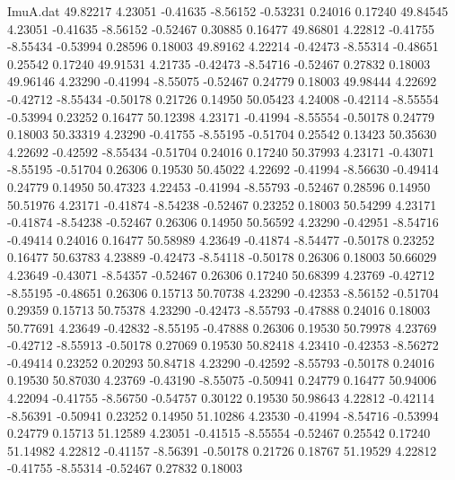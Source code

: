 \begin{filecontents}{ImuA.dat}
  49.82217    4.23051   -0.41635   -8.56152   -0.53231    0.24016    0.17240
  49.84545    4.23051   -0.41635   -8.56152   -0.52467    0.30885    0.16477
  49.86801    4.22812   -0.41755   -8.55434   -0.53994    0.28596    0.18003
  49.89162    4.22214   -0.42473   -8.55314   -0.48651    0.25542    0.17240
  49.91531    4.21735   -0.42473   -8.54716   -0.52467    0.27832    0.18003
  49.96146    4.23290   -0.41994   -8.55075   -0.52467    0.24779    0.18003
  49.98444    4.22692   -0.42712   -8.55434   -0.50178    0.21726    0.14950
  50.05423    4.24008   -0.42114   -8.55554   -0.53994    0.23252    0.16477
  50.12398    4.23171   -0.41994   -8.55554   -0.50178    0.24779    0.18003
  50.33319    4.23290   -0.41755   -8.55195   -0.51704    0.25542    0.13423
  50.35630    4.22692   -0.42592   -8.55434   -0.51704    0.24016    0.17240
  50.37993    4.23171   -0.43071   -8.55195   -0.51704    0.26306    0.19530
  50.45022    4.22692   -0.41994   -8.56630   -0.49414    0.24779    0.14950
  50.47323    4.22453   -0.41994   -8.55793   -0.52467    0.28596    0.14950
  50.51976    4.23171   -0.41874   -8.54238   -0.52467    0.23252    0.18003
  50.54299    4.23171   -0.41874   -8.54238   -0.52467    0.26306    0.14950
  50.56592    4.23290   -0.42951   -8.54716   -0.49414    0.24016    0.16477
  50.58989    4.23649   -0.41874   -8.54477   -0.50178    0.23252    0.16477
  50.63783    4.23889   -0.42473   -8.54118   -0.50178    0.26306    0.18003
  50.66029    4.23649   -0.43071   -8.54357   -0.52467    0.26306    0.17240
  50.68399    4.23769   -0.42712   -8.55195   -0.48651    0.26306    0.15713
  50.70738    4.23290   -0.42353   -8.56152   -0.51704    0.29359    0.15713
  50.75378    4.23290   -0.42473   -8.55793   -0.47888    0.24016    0.18003
  50.77691    4.23649   -0.42832   -8.55195   -0.47888    0.26306    0.19530
  50.79978    4.23769   -0.42712   -8.55913   -0.50178    0.27069    0.19530
  50.82418    4.23410   -0.42353   -8.56272   -0.49414    0.23252    0.20293
  50.84718    4.23290   -0.42592   -8.55793   -0.50178    0.24016    0.19530
  50.87030    4.23769   -0.43190   -8.55075   -0.50941    0.24779    0.16477
  50.94006    4.22094   -0.41755   -8.56750   -0.54757    0.30122    0.19530
  50.98643    4.22812   -0.42114   -8.56391   -0.50941    0.23252    0.14950
  51.10286    4.23530   -0.41994   -8.54716   -0.53994    0.24779    0.15713
  51.12589    4.23051   -0.41515   -8.55554   -0.52467    0.25542    0.17240
  51.14982    4.22812   -0.41157   -8.56391   -0.50178    0.21726    0.18767
  51.19529    4.22812   -0.41755   -8.55314   -0.52467    0.27832    0.18003

\end{filecontents}
